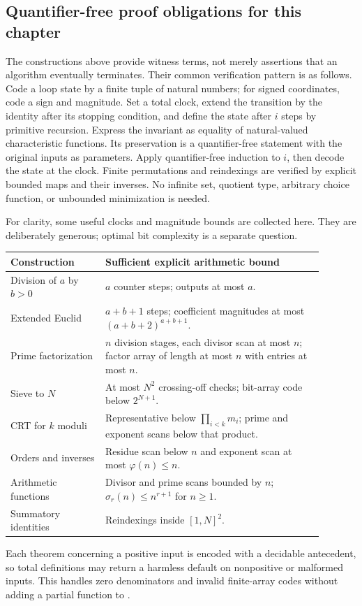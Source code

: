 \subsection{Quantifier-free proof obligations for this chapter}

The constructions above provide witness terms, not merely assertions that
an algorithm eventually terminates.  Their common verification pattern is
as follows.  Code a loop state by a finite tuple of natural numbers; for
signed coordinates, code a sign and magnitude.  Set a total clock, extend
the transition by the identity after its stopping condition, and define
the state after $i$ steps by primitive recursion.  Express the invariant
as equality of natural-valued characteristic functions.  Its preservation
is a quantifier-free statement with the original inputs as parameters.
Apply quantifier-free induction to $i$, then decode the state at the clock.
Finite permutations and reindexings are verified by explicit bounded
maps and their inverses.  No infinite set, quotient type, arbitrary
choice function, or unbounded minimization is needed.

For clarity, some useful clocks and magnitude bounds are collected here.
They are deliberately generous; optimal bit complexity is a separate
question.
\begin{center}
\begin{tabular}{p{0.27\linewidth}p{0.62\linewidth}}
\hline
Construction & Sufficient explicit arithmetic bound\\
\hline
Division of $a$ by $b>0$ & $a$ counter steps; outputs at most $a$.\\
Extended Euclid & $a+b+1$ steps; coefficient magnitudes at most
$(a+b+2)^{a+b+1}$.\\
Prime factorization & $n$ division stages, each divisor scan at most $n$;
factor array of length at most $n$ with entries at most $n$.\\
Sieve to $N$ & At most $N^2$ crossing-off checks; bit-array code
below $2^{N+1}$.\\
CRT for $k$ moduli & Representative below $\prod_{i<k}m_i$;
prime and exponent scans below that product.\\
Orders and inverses & Residue scan below $n$ and exponent scan
at most $\varphi(n)\le n$.\\
Arithmetic functions & Divisor and prime scans bounded by $n$;
$\sigma_r(n)\le n^{r+1}$ for $n\ge1$.\\
Summatory identities & Reindexings inside $[1,N]^2$.\\
\hline
\end{tabular}
\end{center}

Each theorem concerning a positive input is encoded with a decidable
antecedent, so total definitions may return a harmless default on
nonpositive or malformed inputs.  This handles zero denominators and
invalid finite-array codes without adding a partial function to \ipra.
